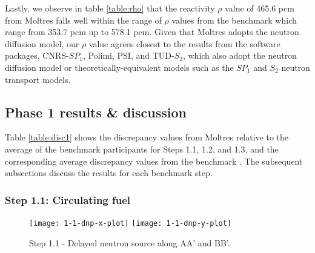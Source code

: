 Lastly, we observe in table \ref{table:rho} that the reactivity $\rho$ value of
465.6 pcm from Moltres falls well within the range of $\rho$ values from the
benchmark which range from 353.7 pcm up to 578.1 pcm. Given that Moltres 
adopts the neutron diffusion model, our $\rho$ value agrees closest to the
results from the software packages, CNRS-$SP_1$, Polimi, PSI, and TUD-$S_2$,
which also adopt the neutron diffusion model or theoretically-equivalent models
such as the $SP_1$ and $S_2$ neutron transport models.

\FloatBarrier

\subsection{Phase 1 results \& discussion}

Table \ref{table:disc1} shows the discrepancy values from Moltres relative to
the average of the benchmark participants for Steps 1.1, 1.2, and 1.3,
and the corresponding average discrepancy values from the benchmark
\citep{tiberga_results_2020}. The subsequent subsections discuss the results
for each benchmark step.

\subsubsection{Step 1.1: Circulating fuel}
%
\begin{figure*}[htb]
	\centering
    \texttt{[image: 1-1-dnp-x-plot]}
    \texttt{[image: 1-1-dnp-y-plot]}
	\caption{Step 1.1 - Delayed neutron source along AA' and BB'.}
	\label{fig:1.1}
\end{figure*}

